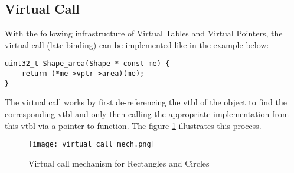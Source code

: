 \subsection{Virtual Call}
With the following infrastructure of Virtual Tables and Virtual Pointers, the virtual call (late binding) can be implemented like in the example below:
\begin{lstlisting}[]
uint32_t Shape_area(Shape * const me) {
    return (*me->vptr->area)(me);
}
\end{lstlisting}

The virtual call works by first de-referencing the vtbl of the object to find the corresponding vtbl and only then calling the appropriate implementation from this vtbl via a pointer-to-function. The figure \ref{fig:virtual_call_mech} illustrates this process.

\begin{figure}[h!]
    \centering
    \texttt{[image: virtual\_call\_mech.png]}
    \caption{Virtual call mechanism for Rectangles and Circles}
    \label{fig:virtual_call_mech}
\end{figure}

 
